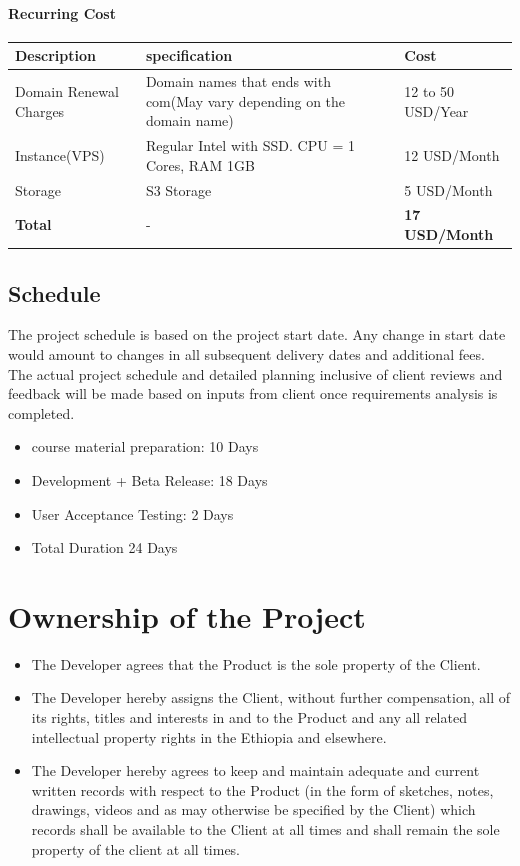 \documentclass[12pt]{extarticle}
\begin{document}
\setlength{\tabcolsep}{20pt}
\renewcommand{\arraystretch}{1.5}
\paragraph{Recurring Cost}
\begin{center}
\begin{tabular}{ |p{2cm}|p{7cm}|p{2cm}| } 
\hline
\textbf{Description} & \textbf{specification} & \textbf{Cost}  \\
\hline
Domain Renewal Charges & Domain names that ends with com(May vary depending on the domain name) & 12 to 50 USD/Year \\ 
\hline
Instance(VPS) & Regular Intel with SSD. CPU = 1 Cores, RAM 1GB  & 12 USD/Month \\
\hline
Storage & S3 Storage & 5 USD/Month \\
\hline
\textbf{Total} & - & \textbf{17 USD/Month} \\
\hline
\end{tabular}
\end{center}

\subsection{Schedule}
The project schedule is based on the project start date. Any change in start date would amount to changes in all subsequent delivery dates and additional fees. The actual project schedule and detailed planning inclusive of client reviews and feedback will be made based on inputs from client once requirements analysis is completed.

\begin{itemize}
	\item course material preparation: 10 Days
	\item Development + Beta Release: 18 Days
	\item User Acceptance Testing: 2 Days
	\item Total Duration 24 Days
\end{itemize}

\section{Ownership of the Project}
\begin{itemize}
	\item The Developer agrees that the Product is the sole property of the Client.
	\item The Developer hereby assigns the Client, without further compensation, all of its rights, titles and interests in and to the Product and any all related intellectual property rights in the Ethiopia and elsewhere.
	\item The Developer hereby agrees to keep and maintain adequate and current written records with respect to the Product (in the form of sketches, notes, drawings, videos and as may otherwise be specified by the Client) which records shall be available to the Client at all times and shall remain the sole property of the client at all times.
\end{itemize}
\end{document}
